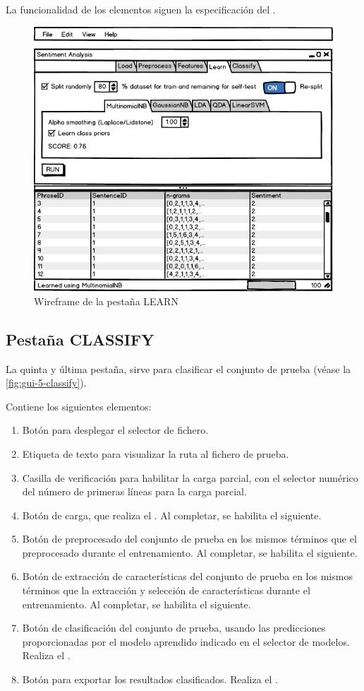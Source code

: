 La funcionalidad de los elementos siguen la especificación del .

\begin{figure}[htbp]
\centering
\includegraphics[width=12cm]{gui-4-learn}
\caption{Wireframe de la pestaña LEARN}
\label{fig:gui-4-learn}
\end{figure}

\FloatBarrier
\newpage
\subsection{Pestaña CLASSIFY}

La quinta y última pestaña,  sirve para clasificar el conjunto de prueba  (véase la \autoref{fig:gui-5-classify}).

Contiene los siguientes elementos:
\begin{enumerate}
\item Botón para desplegar el selector de fichero.
\item Etiqueta de texto para visualizar la ruta al fichero de prueba.
\item Casilla de verificación para habilitar la carga parcial, con el selector numérico del número de primeras líneas para la carga parcial.
\item Botón de carga, que realiza el . Al completar, se habilita el siguiente.
\item Botón de preprocesado del conjunto de prueba en los mismos términos que el preprocesado durante el entrenamiento. Al completar, se habilita el siguiente.
\item Botón de extracción de características del conjunto de prueba en los mismos términos que la extracción y selección de características durante el entrenamiento. Al completar, se habilita el siguiente.
\item Botón de clasificación del conjunto de prueba, usando las predicciones proporcionadas por el modelo aprendido indicado en el selector de modelos. Realiza el .
\item Botón para exportar los resultados clasificados. Realiza el .
\end{enumerate}

